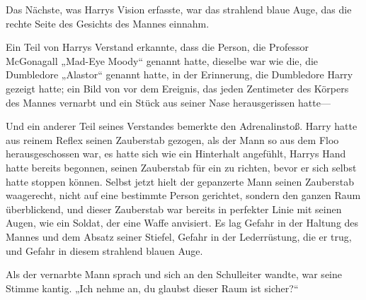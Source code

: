 Das Nächste, was Harrys Vision erfasste, war das strahlend blaue Auge, das die rechte Seite des Gesichts des Mannes einnahm.

Ein Teil von Harrys Verstand erkannte, dass die Person, die Professor McGonagall „Mad-Eye Moody“ genannt hatte, dieselbe war wie die, die Dumbledore „Alastor“ genannt hatte, in der Erinnerung, die Dumbledore Harry gezeigt hatte; ein Bild von vor dem Ereignis, das jeden Zentimeter des Körpers des Mannes vernarbt und ein Stück aus seiner Nase herausgerissen hatte—

Und ein anderer Teil seines Verstandes bemerkte den Adrenalinstoß. Harry hatte aus reinem Reflex seinen Zauberstab gezogen, als der Mann so aus dem Floo herausgeschossen war, es hatte sich wie ein Hinterhalt angefühlt, Harrys Hand hatte bereits begonnen, seinen Zauberstab für ein  zu richten, bevor er sich selbst hatte stoppen können.
Selbst jetzt hielt der gepanzerte Mann seinen Zauberstab waagerecht, nicht auf eine bestimmte Person gerichtet, sondern den ganzen Raum überblickend, und dieser Zauberstab war bereits in perfekter Linie mit seinen Augen, wie ein Soldat, der eine Waffe anvisiert. Es lag Gefahr in der Haltung des Mannes und dem Absatz seiner Stiefel, Gefahr in der Lederrüstung, die er trug, und Gefahr in diesem strahlend blauen Auge.

Als der vernarbte Mann sprach und sich an den Schulleiter wandte, war seine Stimme kantig. „Ich nehme an, du glaubst dieser Raum ist sicher?“

